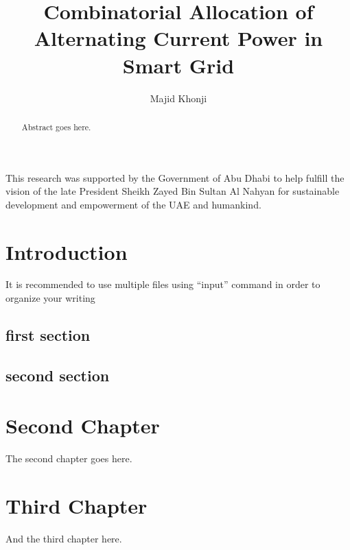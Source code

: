 \documentclass[pdflinks, master]{masdar-thesis}
\title{Combinatorial Allocation of Alternating Current Power in Smart Grid}
\author{Majid Khonji}
\begin{document}
\maketitle


\begin{abstract}
Abstract goes here. 
\end{abstract}

\begin{dedication}
	This research was supported by the Government of Abu Dhabi to help fulfill the vision of the late President Sheikh Zayed
	Bin Sultan Al Nahyan for sustainable development and empowerment of the UAE and humankind.
\end{dedication}
\lists %

\chapter{Introduction}
It is recommended to use multiple files using ``input'' command in order to organize your writing
\section{first section}

\section{second section}

\chapter{Second Chapter}
The second chapter goes here.
\chapter{Third Chapter}
And the third chapter here.
\end{document}
